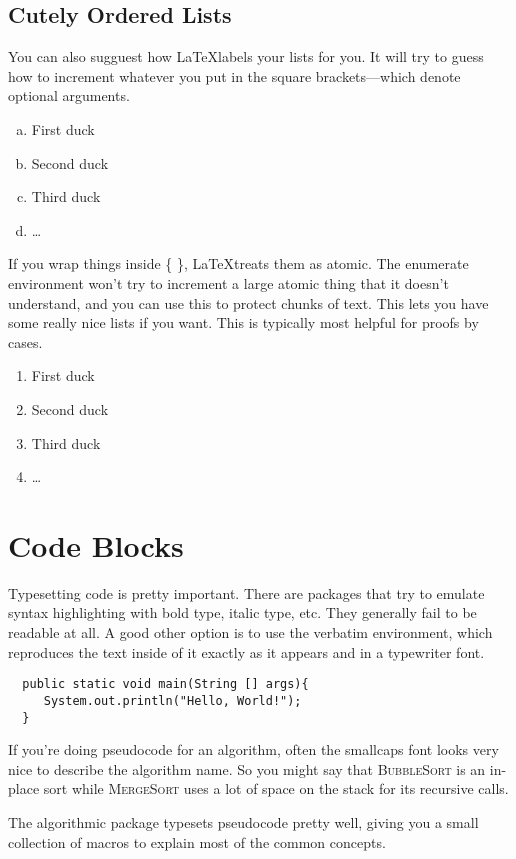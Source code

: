 \documentclass{article}
\begin{document}
\subsection{Cutely Ordered Lists}
You can also sugguest how \LaTeX labels your lists for you. It will try to
guess how to increment whatever you put in the square brackets---which denote
optional arguments.
\begin{enumerate}[a.]
  \item First duck
  \item Second duck
  \item Third duck
  \item \ldots
\end{enumerate}

If you wrap things inside \{ \}, \LaTeX treats them as atomic. The enumerate
environment won't try to increment a large atomic thing that it doesn't
understand, and you can use this to protect chunks of text. This lets you have
some really nice lists if you want. This is typically most helpful for proofs
by cases.
\begin{enumerate}[{Case} I:]
  \item First duck
  \item Second duck
  \item Third duck
  \item \ldots
\end{enumerate}

\section{Code Blocks}
Typesetting code is pretty important. There are packages that try to emulate
syntax highlighting with bold type, italic type, etc. They generally fail to
be readable at all. A good other option is to use the verbatim environment,
which reproduces the text inside of it exactly as it appears and in a
typewriter font.

\begin{verbatim}
  public static void main(String [] args){
     System.out.println("Hello, World!");
  }
\end{verbatim}

If you're doing pseudocode for an algorithm, often the smallcaps font looks
very nice to describe the algorithm name. So you might say that
\textsc{BubbleSort} is an in-place sort while \textsc{MergeSort} uses a lot of
space on the stack for its recursive calls.

The algorithmic package typesets pseudocode pretty well, giving you a small
collection of macros to explain most of the common concepts.
\end{document}
